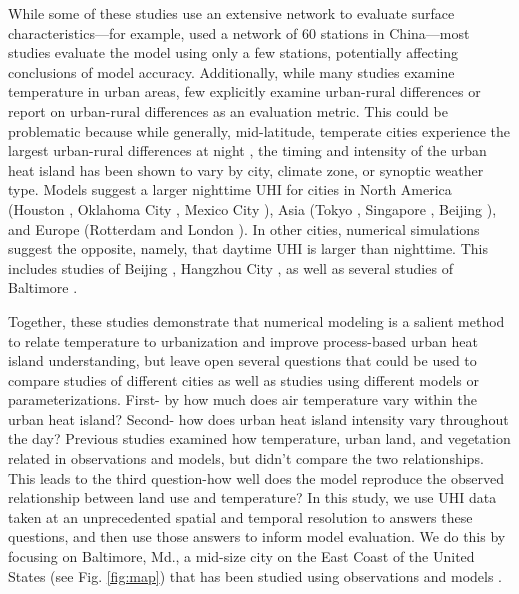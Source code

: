 While some of these studies use an extensive network to evaluate surface characteristics---for example, \cite{miao2011impacts} used a network of 60 stations in China---most studies evaluate the model using only a few stations, potentially affecting conclusions of model accuracy. 
Additionally, while many studies examine temperature in urban areas, few explicitly examine urban-rural differences or report on urban-rural differences as an evaluation metric. This could be problematic because while generally, mid-latitude, temperate cities experience the largest urban-rural differences at night \citep{oke82,scott2018reduced}, the timing and intensity of the urban heat island has been shown to vary by city, climate zone, or synoptic weather type\cite{hardin2017urban}. 
Models suggest a larger nighttime UHI for cities in North America (Houston \citep{chen2011numerical}, Oklahoma City \citep{hu2013impact}, Mexico City \citep{cui2012seasonal}), Asia (Tokyo \citep{kusaka2012urban}, Singapore \cite{li2013multi}, Beijing \citep{wang2013contribution}), and Europe (Rotterdam \citep{theeuwes2014seasonal} and London \citep{grawe2013modelling}).
In other cities, numerical simulations suggest the opposite, namely, that daytime UHI is larger than nighttime. This includes studies of Beijing \citep{zhang2011impact}, Hangzhou City \citep{chen2014wrf}, as well as several studies of Baltimore \citep{zhang2011impact,li2013synergistic, li2015contrasting}.

Together, these studies demonstrate that numerical modeling is a salient method to relate temperature to urbanization and improve process-based urban heat island understanding, but leave open several questions that could be used to compare studies of different cities as well as studies using different models or parameterizations.
 First- by how much does air temperature vary within the urban heat island? Second- how does urban heat island intensity vary throughout the day? Previous studies examined how temperature, urban land, and vegetation related in observations and models, but didn't compare the two relationships. This leads to the third question-how well does the model reproduce the observed relationship between land use and temperature? 
 In this study, %
 we use UHI data taken at an unprecedented spatial and temporal resolution to answers these questions, and then use those answers to inform model evaluation. %
We do this by focusing on Baltimore, Md., a mid-size city on the East Coast of the United States (see Fig. \ref{fig:map}) that has been studied using observations \citep{Huang20111753,scott2017intraurban, scott2018reduced,brazel2000tale} and models \citep{zhang2011impact,li2013development,li2013synergistic,li2015contrasting}.  

